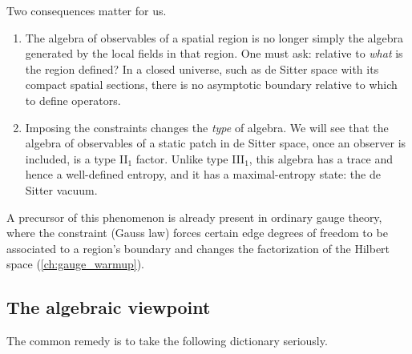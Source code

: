 Two consequences matter for us.

\begin{enumerate}
\item The algebra of observables of a spatial region is no longer simply the algebra generated by the local fields in that region. One must ask: relative to \emph{what} is the region defined? In a closed universe, such as de Sitter space with its compact spatial sections, there is no asymptotic boundary relative to which to define operators.
\item Imposing the constraints changes the \emph{type} of algebra. We will see that the algebra of observables of a static patch in de Sitter space, once an observer is included, is a type II$_1$ factor. Unlike type III$_1$, this algebra has a trace and hence a well-defined entropy, and it has a maximal-entropy state: the de Sitter vacuum.
\end{enumerate}

A precursor of this phenomenon is already present in ordinary gauge theory, where the constraint (Gauss law) forces certain edge degrees of freedom to be associated to a region's boundary and changes the factorization of the Hilbert space (\cref{ch:gauge_warmup}).

\subsection{The algebraic viewpoint}

The common remedy is to take the following dictionary seriously.

\begin{center}
\renewcommand{\arraystretch}{1.3}
\end{center}

